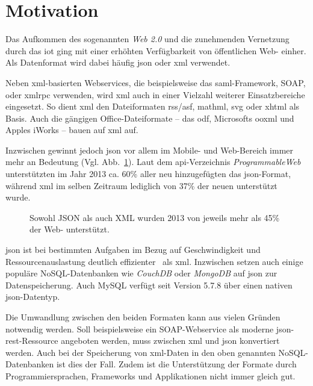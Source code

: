 \section{Motivation}
\label{sec:motivation}
Das Aufkommen des sogenannten \emph{Web 2.0} und die zunehmenden Vernetzung
durch das \gls{iot} ging mit einer erhöhten
Verfügbarkeit von öffentlichen Web- einher. Als Datenformat wird dabei
häufig \acrshort{json} oder \acrshort{xml} verwendet.

Neben \acrshort{xml}-basierten Webservices, die beispielsweise das \acrshort{saml}-Framework, SOAP,
oder \gls{xmlrpc} verwenden, wird \acrshort{xml} auch in einer Vielzahl weiterer
Einsatzbereiche eingesetzt. So dient \acrshort{xml} den Dateiformaten \acrshort{rss}/\acrshort{asf}, \acrshort{mathml},
\gls{svg} oder \gls{xhtml} als Basis. Auch die gängigen
Office-Dateiformate -- das \acrfull{odf}, Microsofts %
\acrfull{ooxml} und Apples iWorks -- bauen auf \acrshort{xml} auf. %

Inzwischen gewinnt jedoch \acrshort{json} vor allem im Mobile-
und Web-Bereich immer mehr an Bedeutung (Vgl. Abb.~\ref{fig:xmljsonapis}). Laut dem \acrshort{api}-Verzeichnis
\emph{ProgrammableWeb} unterstützten im Jahr 2013 ca. 60\% aller neu
hinzugefügten  das \acrshort{json}-Format, während
\acrshort{xml} im selben Zeitraum lediglich von 37\% der neuen 
unterstützt wurde.~\cite{duvander2013convergence}

\begin{figure}[h!]
    \begin{center}
        
    \end{center}
    \caption{Sowohl JSON als auch XML wurden 2013 von jeweils mehr als 45\% der Web- unterstützt.}
    \label{fig:xmljsonapis}
\end{figure}


\acrshort{json} ist bei bestimmten Aufgaben im Bezug auf Geschwindigkeit und
Ressourcenauslastung deutlich effizienter~\cite{nurseitov2009comparison} als
\acrshort{xml}\@. Inzwischen setzen auch einige populäre NoSQL-Datenbanken wie
\emph{CouchDB} oder \emph{MongoDB} auf \acrshort{json} zur Datenspeicherung. Auch
MySQL verfügt seit Version 5.7.8 über einen nativen \acrshort{json}-Datentyp.

Die Umwandlung zwischen den beiden Formaten kann aus vielen Gründen
notwendig werden. Soll beispielsweise ein SOAP-Webservice als moderne
\acrshort{json}-\acrshort{rest}-Ressource angeboten werden, muss zwischen \acrshort{xml} und \acrshort{json} konvertiert
werden. Auch bei der Speicherung von \acrshort{xml}-Daten in den oben genannten NoSQL-Datenbanken
ist dies der Fall. Zudem ist die Unterstützung der Formate durch
Programmiersprachen, Frameworks und Applikationen nicht immer gleich gut.

